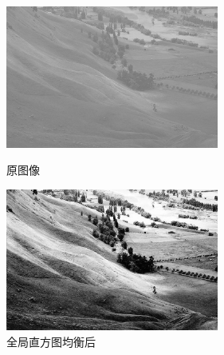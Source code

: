 \documentclass[11pt, a4paper, UTF8]{ctexart}
\begin{document}
\begin{figure}[H]
  \centering
  \begin{minipage}[t]{0.48\textwidth}
  \centering
  \includegraphics[width=7cm]{gray_mountain.jpg}
  \caption{原图像}
  \end{minipage}
  \begin{minipage}[t]{0.48\textwidth}
  \centering
  \includegraphics[width=7cm]{gray_mountain_global_converted.jpg}
  \caption{全局直方图均衡后}
  \end{minipage}
\end{figure}
\end{document}
